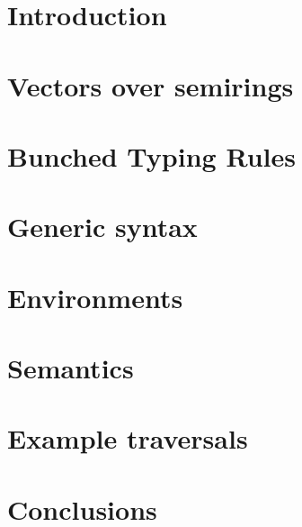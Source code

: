 \documentclass[runningheads]{llncs}
\begin{document}
\section{Introduction}\label{sec:intro}


\section{Vectors over semirings}\label{sec:algebra}


\section{Bunched Typing Rules}\label{sec:bunched-rules}


\section{Generic syntax}\label{sec:syntax}


\section{Environments}\label{sec:env}


\section{Semantics}\label{sec:semantics}


\section{Example traversals}\label{sec:examples}


\section{Conclusions}\label{sec:conc}

%
%
%


\end{document}
